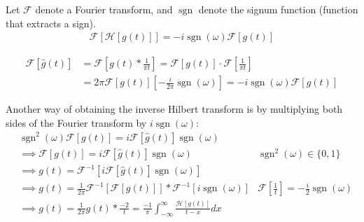\documentclass[12pt, english]{book}
\makeatletter
\renewenvironment{proof}[1][\proofname]{\par
	\pushQED{\qed}%
	\normalfont \topsep6\p@\@plus6\p@\relax
	\list{}{%
		\settowidth{\leftmargin}{\itshape\proofname:\hskip\labelsep}%
		\setlength{\labelwidth}{0pt}%
		\setlength{\itemindent}{-\leftmargin}%
	}%
	\item[\hskip\labelsep\itshape#1\@addpunct{:}]\ignorespaces
	}{ \popQED\endlist\@endpefalse}
\makeatother
\begin{document}
	\begin{lemma}
		\label{Fourier Transform of Hilbert Transform Lemma - Complex}
		Let \(\mathcal{F}\) denote a Fourier transform, and \(\operatorname{sgn}\) denote the signum function (function that extracts a sign).
		\begin{align*}
			\mathcal{F}[\mathcal{H}[g(t)]] = - i \operatorname{sgn}(\omega) \mathcal{F}[g(t)]
		\end{align*}
	\end{lemma}	
	\begin{proof}
		\begin{align*}
			\mathcal{F}[\hat{g}(t)] 
			 &=  \mathcal{F}\left[g(t) \ast \frac{1}{\pi t}\right] 
			  = \mathcal{F}[g(t)] \cdot \mathcal{F}\left[\frac{1}{\pi t}\right] \\
			 &= 2\pi \mathcal{F}[g(t)] \left[- \frac{i}{2\pi} \operatorname{sgn}(\omega) \right] 
			  = -i \operatorname{sgn}(\omega) \mathcal{F}[g(t)] 
		\end{align*}
	\end{proof}
	
	Another way of obtaining the inverse Hilbert transform  is by multiplying both sides of the Fourier transform by \(i \operatorname{sgn}(\omega)\):
	\begin{align*}
		&\operatorname{sgn}^2(\omega) \mathcal{F}[g(t)] = i \mathcal{F}[\hat{g}(t)] \operatorname{sgn}(\omega) \\
		&\implies \mathcal{F}[g(t)] = i \mathcal{F}[\hat{g}(t)] \operatorname{sgn}(\omega)
			& \operatorname{sgn}^2(\omega) \in \{0, 1\} \\
		&\implies g(t) = \mathcal{F}^{-1}[i\mathcal{F}[\hat{g}(t)] \operatorname{sgn}(\omega)] \\
		&\implies g(t) = \frac{1}{2\pi} \mathcal{F}^{-1}[\mathcal{F}[g(t)]] \ast \mathcal{F}^{-1}[i\operatorname{sgn}(\omega)]
			& \mathcal{F}\left[\frac{1}{t}\right] = - \frac{i}{2}\operatorname{sgn}(\omega) \\
		&\implies g(t) 
			= \frac{1}{2\pi} g(t) \ast \frac{-2}{t} 
			= \frac{-1}{\pi} \int_{-\infty}^{\infty} \frac{\mathcal{H}[g(t)]}{t-x} dx
	\end{align*}
\end{document}
